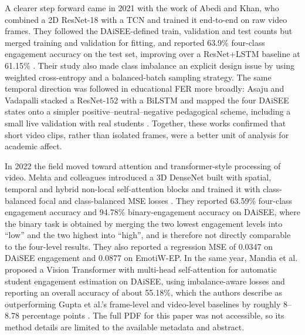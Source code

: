 A clearer step forward came in 2021 with the work of Abedi and Khan, who combined a 2D ResNet-18 with a \ac{TCN} and trained it end-to-end on raw video frames. They followed the \ac{DAiSEE}-defined train, validation and test counts but merged training and validation for fitting, and reported 63.9\% four-class engagement accuracy on the test set, improving over a ResNet+\ac{LSTM} baseline at 61.15\% \cite{abedi_improving_2021}. Their study also made class imbalance an explicit design issue by using weighted cross-entropy and a balanced-batch sampling strategy. The same temporal direction was followed in educational \ac{FER} more broadly: Asaju and Vadapalli stacked a ResNet-152 with a \ac{BiLSTM} and mapped the four \ac{DAiSEE} states onto a simpler positive--neutral--negative pedagogical scheme, including a small live validation with real students \cite{asaju_adaptive_2022}. Together, these works confirmed that short video clips, rather than isolated frames, were a better unit of analysis for academic affect.

In 2022 the field moved toward attention and transformer-style processing of video. Mehta and colleagues introduced a 3D DenseNet built with spatial, temporal and hybrid non-local self-attention blocks and trained it with class-balanced focal and class-balanced MSE losses \cite{mehta_three-dimensional_2022}. They reported 63.59\% four-class engagement accuracy and 94.78\% binary-engagement accuracy on \ac{DAiSEE}, where the binary task is obtained by merging the two lowest engagement levels into ``low'' and the two highest into ``high'', and is therefore not directly comparable to the four-level results. They also reported a regression MSE of 0.0347 on \ac{DAiSEE} engagement and 0.0877 on EmotiW-EP. In the same year, Mandia et al. proposed a Vision Transformer with multi-head self-attention for automatic student engagement estimation on \ac{DAiSEE}, using imbalance-aware losses and reporting an overall accuracy of about 55.18\%, which the authors describe as outperforming Gupta et al.'s frame-level and video-level baselines by roughly 8--8.78 percentage points \cite{mandia_vision_2022}. The full PDF for this paper was not accessible, so its method details are limited to the available metadata and abstract.

